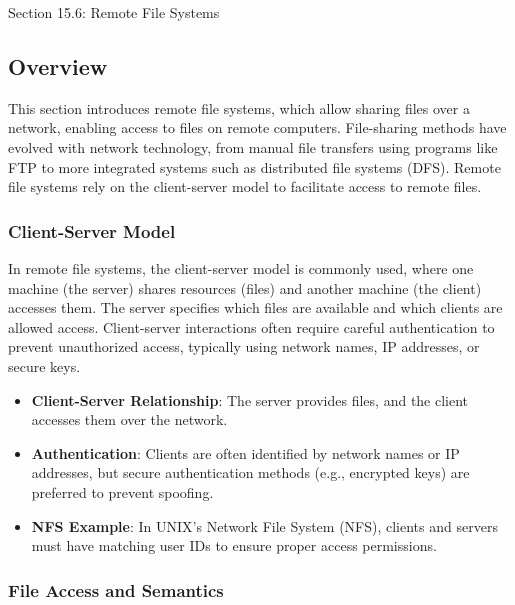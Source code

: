 \begin{notes}{Section 15.6: Remote File Systems}
    \subsection*{Overview}

    This section introduces remote file systems, which allow sharing files over a network, enabling access to files on remote computers. File-sharing methods have evolved with network technology, from 
    manual file transfers using programs like FTP to more integrated systems such as distributed file systems (DFS). Remote file systems rely on the client-server model to facilitate access to remote files.
    
    \subsubsection*{Client-Server Model}
    
    In remote file systems, the client-server model is commonly used, where one machine (the server) shares resources (files) and another machine (the client) accesses them. The server specifies which 
    files are available and which clients are allowed access. Client-server interactions often require careful authentication to prevent unauthorized access, typically using network names, IP addresses, 
    or secure keys.
    
    \begin{highlight}
    
        \begin{itemize}
            \item \textbf{Client-Server Relationship}: The server provides files, and the client accesses them over the network.
            \item \textbf{Authentication}: Clients are often identified by network names or IP addresses, but secure authentication methods (e.g., encrypted keys) are preferred to prevent spoofing.
            \item \textbf{NFS Example}: In UNIX's Network File System (NFS), clients and servers must have matching user IDs to ensure proper access permissions.
        \end{itemize}
    
    \end{highlight}
    
    \subsubsection*{File Access and Semantics}
    

\end{notes}
